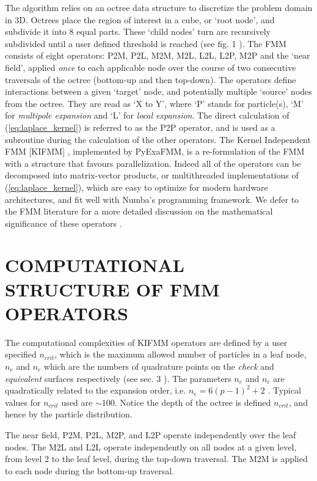 \documentclass{IEEEcsmag}
\begin{document}
The algorithm relies on an octree data structure to discretize the problem domain in 3D. Octrees place the region of interest in a cube, or `root node', and subdivide it into 8 equal parts. These `child nodes' turn are recursively subdivided until a user defined threshold is reached (see fig. 1 \cite{Sundar2007}). The FMM consists of eight operators: P2M, P2L, M2M, M2L, L2L, L2P, M2P and the `near field', applied \textit{once} to each applicable node over the course of two consecutive traversals of the octree (bottom-up and then top-down). The operators define interactions between a given `target' node, and potentially multiple `source' nodes from the octree. They are read as `X to Y', where `P' stands for particle(s), `M' for \textit{multipole expansion} and `L' for \textit{local expansion}. The direct calculation of (\ref{eq:laplace_kernel}) is referred to as the P2P operator, and is used as a subroutine during the calculation of the other operators. The Kernel Independent FMM [KIFMM] \cite{Ying2004}, implemented by PyExaFMM, is a re-formulation of the FMM with a structure that favours parallelization. Indeed all of the operators can be decomposed into matrix-vector products, or multithreaded implementations of (\ref{eq:laplace_kernel}), which are easy to optimize for modern hardware architectures, and fit well with Numba's programming framework. We defer to the FMM literature for a more detailed discussion on the mathematical significance of these operators \cite{Ying2004,Greengard1987}.

\section{COMPUTATIONAL STRUCTURE OF FMM OPERATORS}

The computational complexities of KIFMM operators are defined by a user specified $n_{crit}$, which is the maximum allowed number of particles in a leaf node, $n_e$ and $n_c$ which are the numbers of quadrature points on the \textit{check} and \textit{equivalent} surfaces respectively (see sec. 3 \cite{Ying2004}). The parameters $n_e$ and $n_c$ are quadratically related to the expansion order, i.e. $n_e = 6(p-1)^2 + 2$ \cite{Ying2004}. Typical values for $n_{crit}$ used are $\sim 100$. Notice the depth of the octree is defined $n_{crit}$, and hence by the particle distribution.

The near field, P2M, P2L, M2P, and L2P operate independently over the leaf nodes. The M2L and L2L operate independently on all nodes at a given level, from level 2 to the leaf level, during the top-down traversal. The M2M is applied to each node during the bottom-up traversal.
\end{document}
